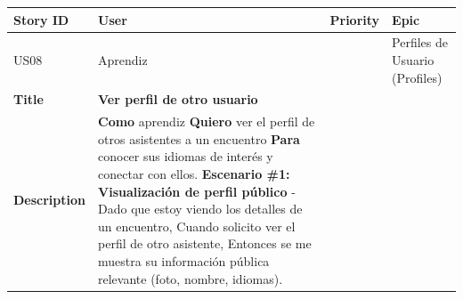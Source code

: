 {\def\LTcaptype{none} %
\begin{longtable}[]{@{}
  >{\raggedright\arraybackslash}p{}
  >{\raggedright\arraybackslash}p{}
  >{\raggedright\arraybackslash}p{}
  >{\raggedright\arraybackslash}p{}@{}}
\toprule\noalign{}
\begin{minipage}[b]{\linewidth}\raggedright
Story ID
\end{minipage} & \begin{minipage}[b]{\linewidth}\raggedright
User
\end{minipage} & \begin{minipage}[b]{\linewidth}\raggedright
Priority
\end{minipage} & \begin{minipage}[b]{\linewidth}\raggedright
Epic
\end{minipage} \\
\midrule\noalign{}
\endhead
\bottomrule\noalign{}
\endlastfoot
US08 & Aprendiz & 2 & Perfiles de Usuario (Profiles) \\
\textbf{Title} & \textbf{Ver perfil de otro usuario} & & \\
\textbf{Description} & \textbf{Como} aprendiz \textbf{Quiero} ver el
perfil de otros asistentes a un encuentro \textbf{Para} conocer sus
idiomas de interés y conectar con ellos. \textbf{Escenario \#1:
Visualización de perfil público} - Dado que estoy viendo los detalles de
un encuentro, Cuando solicito ver el perfil de otro asistente, Entonces
se me muestra su información pública relevante (foto, nombre, idiomas).
& & \\
\end{longtable}
}

